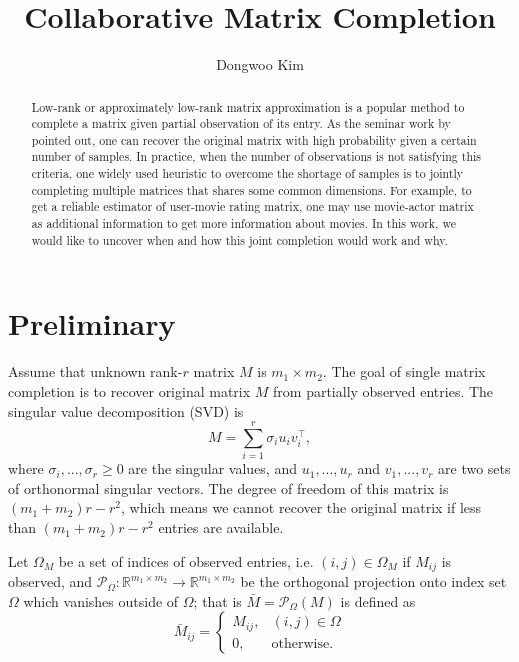 \documentclass{article} %
\title{Collaborative Matrix Completion}
\author{
Dongwoo Kim
}
\newcommand\mc{\mathcal} %
\begin{document}
\maketitle

\begin{abstract}
Low-rank or approximately low-rank matrix approximation is a popular method to complete a matrix given partial observation of its entry. As the seminar work by \cite{candes2009exact} pointed out, one can recover the original matrix with high probability given a certain number of samples. In practice, when the number of observations is not satisfying this criteria, one widely used heuristic to overcome the shortage of samples is to jointly completing multiple matrices that shares some common dimensions. For example, to get a reliable estimator of user-movie rating matrix, one may use movie-actor matrix as additional information to get more information about movies. In this work, we would like to uncover when and how this joint completion would work and why.
\end{abstract}

\section{Preliminary}
Assume that unknown rank-$r$ matrix $M$ is $m_1 \times m_2$. The goal of single matrix completion is to recover original matrix $M$ from partially observed entries. The singular value decomposition (SVD) is
\begin{equation}
M = \sum_{i=1}^{r}\sigma_i u_i v_i^\top,
\end{equation}
where $\sigma_i,...,\sigma_r \geq 0$ are the singular values, and $u_1,...,u_r$ and $v_1,...,v_r$ are two sets of orthonormal singular vectors. The degree of freedom of this matrix is $(m_1+m_2)r - r^2$, which means we cannot recover the original matrix if less than $(m_1+m_2)r - r^2$ entries are available.  

Let $\Omega_M$ be a set of indices of observed entries, i.e. $(i,j) \in \Omega_M$ if $M_{ij}$ is observed, and $\mc{P}_{\Omega}: \mathbb{R}^{m_1\times m_2} \rightarrow \mathbb{R}^{m_1\times m_2}$ be the orthogonal projection onto index set $\Omega$ which vanishes outside of $\Omega$; that is $\bar{M} = \mc{P}_{\Omega}(M)$ is defined as
\begin{equation}
\bar{M}_{ij} = \left\{
  \begin{array}{lr}
    M_{ij}, & (i,j) \in \Omega\\
    0, & \text{otherwise}.
  \end{array}
\right.
\end{equation}
\end{document}

